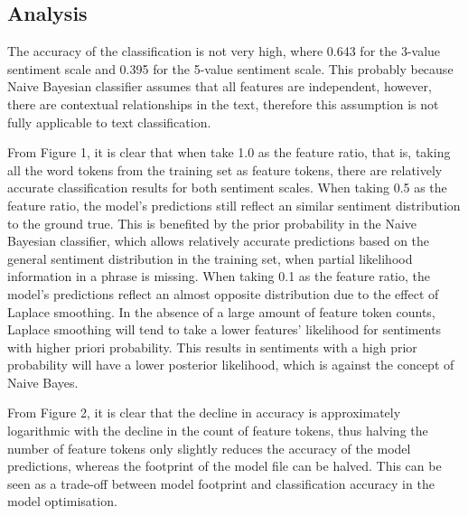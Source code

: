 \documentclass[11pt,a4paper]{article}
\begin{document}
\subsection*{\Large Analysis}

The accuracy of the classification is not very high, where 0.643 for the 3-value sentiment scale and 0.395 for the 5-value sentiment scale. This probably because Naive Bayesian classifier assumes that all features are independent, however, there are contextual relationships in the text, therefore this assumption is not fully applicable to text classification.

From Figure 1, it is clear that when take 1.0 as the feature ratio, that is, taking all the word tokens from the training set as feature tokens, there are relatively accurate classification results for both sentiment scales. When taking 0.5 as the feature ratio, the model's predictions still reflect an similar sentiment distribution to the ground true. This is benefited by the prior probability in the Naive Bayesian classifier, which allows relatively accurate predictions based on the general sentiment distribution in the training set, when partial likelihood information in a phrase is missing. When taking 0.1 as the feature ratio, the model's predictions reflect an almost opposite distribution due to the effect of Laplace smoothing. In the absence of a large amount of feature token counts, Laplace smoothing will tend to take a lower features' likelihood for sentiments with higher priori probability. This results in sentiments with a high prior probability will have a lower posterior likelihood, which is against the concept of Naive Bayes.

From Figure 2, it is clear that the decline in accuracy is approximately logarithmic with the decline in the count of feature tokens, thus halving the number of feature tokens only slightly reduces the accuracy of the model predictions, whereas the footprint of the model file can be halved. This can be seen as a trade-off between model footprint and classification accuracy in the model optimisation.
\end{document}
